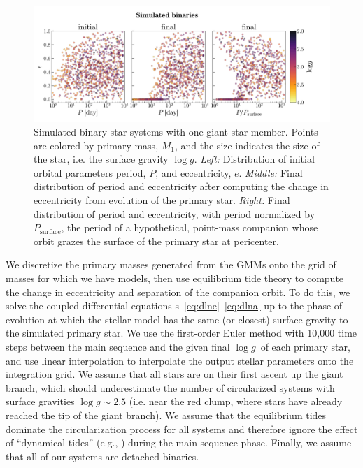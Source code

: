 \documentclass[modern, letterpaper]{aastex62}
\newcommand{\logg}{\ensuremath{\log g}}
\newcommand{\Psurf}{\ensuremath{P_\textrm{surface}}}
\begin{document}
\begin{figure}[htbp]
\begin{center}
\includegraphics[trim={0 0 1cm 0}, clip, width=\linewidth]{simulated}
\end{center}
\caption{%
Simulated binary star systems with one giant star member.
Points are colored by primary mass, $M_1$, and the size indicates the size of
the star, i.e. the surface gravity $\log g$.
\textit{Left:} Distribution of initial orbital parameters period, $P$, and
eccentricity, $e$.
\textit{Middle:} Final distribution of period and eccentricity after computing
the change in eccentricity from evolution of the primary star.
\textit{Right:} Final distribution of period and eccentricity, with period
normalized by \Psurf, the period of a hypothetical, point-mass
companion whose orbit grazes the surface of the primary star at pericenter.
\label{fig:simulated}
}
\end{figure}

We discretize the primary masses generated from the GMMs onto the grid of masses
for which we have  models, then use equilibrium tide theory to
compute the change in eccentricity and separation of the companion orbit.
To do this, we solve the coupled differential equations \eqname
s~\ref{eq:dlne}--\ref{eq:dlna} up to the phase of evolution at which the stellar
model has the same (or closest) surface gravity to the simulated primary star.
We use the first-order Euler method with 10,000 time steps between the main
sequence and the given final \logg\ of each primary star, and use linear
interpolation to interpolate the  output stellar parameters onto
the integration grid.
We assume that all stars are on their first ascent up the giant branch, which
should underestimate the number of circularized systems with surface gravities
$\logg \sim 2.5$ (i.e. near the red clump, where stars have already reached the
tip of the giant branch).
We assume that the equilibrium tides dominate the circularization process for
all systems and therefore ignore the effect of ``dynamical tides''
(e.g., \citealt{Goodman:1998}) during the main sequence phase.
Finally, we assume that all of our systems are detached binaries.
\end{document}
